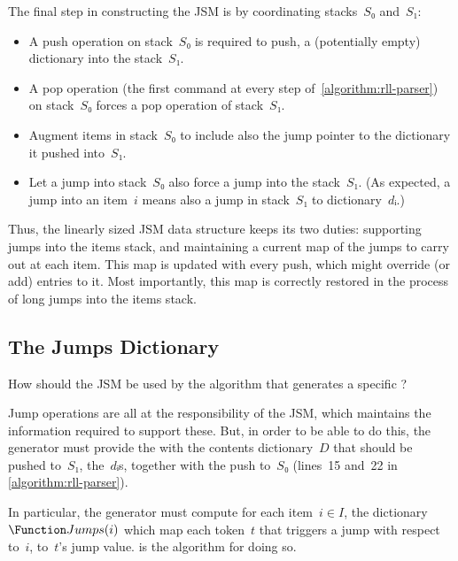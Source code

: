 The final step in constructing the JSM is by coordinating
stacks~$S₀$ and~$S₁$:
\begin{itemize}
  \item A push operation on stack~$S₀$ is required to push, a (potentially
        empty) dictionary into the stack~$S₁$.
  \item A pop operation (the first command at every step of~\cref{algorithm:rll-parser})
        on stack~$S₀$ forces a pop operation of stack~$S₁$.
  \item Augment items in stack~$S₀$ to include also the jump pointer to
        the dictionary it pushed into~$S₁$.
  \item Let a jump into stack~$S₀$ also
        force a jump into the stack~$S₁$.
        (As expected, a jump into an item~$i$ means also a jump
        in stack~$S₁$ to dictionary~$dᵢ$.)
\end{itemize}
Thus, the linearly sized JSM data structure keeps its two
duties: supporting jumps into the items stack,
and maintaining a current map of the jumps to carry out at each item.
This map is updated with every push, which might
override (or add) entries to it.
Most importantly, this map is correctly restored
in the process of long jumps into the items stack.

\subsection{The Jumps Dictionary}
How should the JSM be used by the algorithm that generates
a specific \RLLp?

Jump operations are all at the responsibility of the JSM,
which maintains the information required to support these.
But, in order to be able to do this, the generator must
provide the \RLLp with the contents dictionary~$D$ that should be pushed
to~$S₁$, the~$dᵢ$s, together with the push to~$S₀$ (lines~15 and~22 in
\cref{algorithm:rll-parser}).

In particular, the \RLLp generator must compute for each
item~$i∈I$, the dictionary~$\Function Jumps(i)$ which
map each token~$t$ that triggers a jump with
respect to~$i$, to~$t$'s jump value.
 is the algorithm for doing so.

